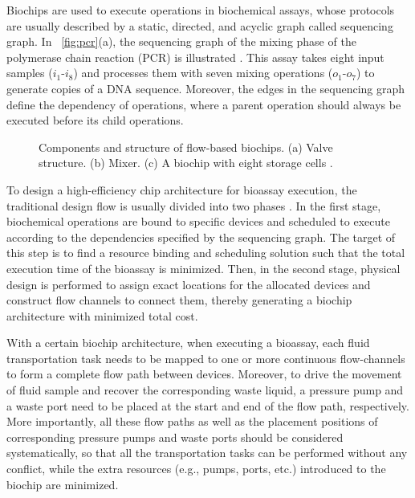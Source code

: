 Biochips are used to execute operations in biochemical assays, whose protocols are usually described by a static, directed, and acyclic graph called sequencing graph. In
\figname~\ref{fig:pcr}(a), the sequencing graph of
the mixing phase of the polymerase chain reaction (PCR) is illustrated \cite{zhang2002microelectrofluidic}. This assay takes eight input samples ($i_1$-$i_8$) and processes them with seven mixing operations ($o_1$-$o_7$) to generate copies
of a DNA sequence. Moreover, the edges in the sequencing graph define the dependency of
operations, where a parent operation should always be executed before its child operations.

\begin{figure}[t]
{\figurefontsize
\centering

\caption{Components and structure of flow-based biochips. (a)
Valve structure. (b) Mixer. (c) A biochip with eight storage cells \cite{AminTA09}.}
\label{fig:valve_mixer_storage}
}
\vspace{-0.5cm}
\end{figure}

To design a high-efficiency chip architecture for bioassay execution, the traditional design flow is usually divided into two phases \cite{MinhassPMB12}. In the first stage, biochemical operations are bound to specific devices and scheduled to execute according to the dependencies specified by the sequencing graph. The target of this step is to find a resource binding and scheduling solution such that the total execution time of the bioassay is minimized. Then, in the second stage, physical design is performed to assign exact locations for the allocated devices and construct flow channels to connect them, thereby generating a biochip architecture with minimized total cost.

With a certain biochip architecture, when executing a bioassay, each fluid transportation task needs to be mapped to one or more continuous flow-channels to form a complete flow path between devices. Moreover, to drive the movement of fluid sample and recover the corresponding waste liquid, a pressure pump and a waste port need to be placed at the start and end of the flow path, respectively. More importantly, all these flow paths as well as the placement positions of corresponding pressure pumps and waste ports should be considered systematically, so that all the transportation tasks can be performed without any conflict, while the extra resources (e.g., pumps, ports, etc.) introduced to the biochip are minimized.


